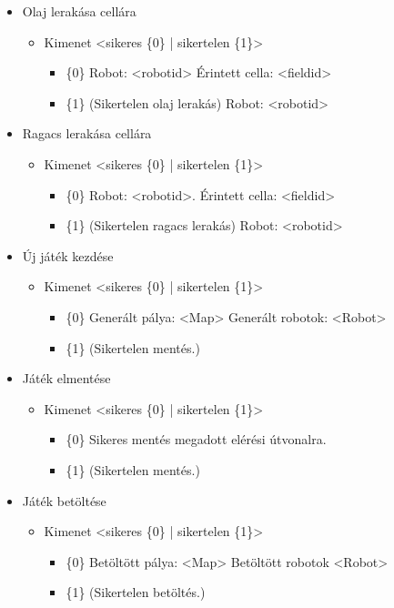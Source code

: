 \begin{itemize}
	\item Olaj lerakása cellára
	\begin{itemize}
		\item Kimenet <sikeres \{0\} | sikertelen \{1\}>
		\begin{itemize}
			\item \{0\} Robot: <robotid>  Érintett cella: <fieldid>
			\item \{1\} (Sikertelen olaj lerakás) Robot: <robotid>
		\end{itemize}
	\end{itemize}
	
	\item Ragacs lerakása cellára
	\begin{itemize}
		\item Kimenet <sikeres \{0\} | sikertelen \{1\}>
		\begin{itemize}
			\item \{0\} Robot: <robotid>. Érintett cella: <fieldid>
			\item \{1\} (Sikertelen ragacs lerakás) Robot: <robotid>
		\end{itemize}
	\end{itemize}	
	
	\item Új játék kezdése
	\begin{itemize}
		\item Kimenet <sikeres \{0\} | sikertelen \{1\}>
		\begin{itemize}
			\item \{0\} Generált pálya: <Map> Generált robotok: <Robot>
			\item \{1\} (Sikertelen mentés.)
		\end{itemize}
	\end{itemize}
	
	
	\item Játék elmentése
	\begin{itemize}
		\item Kimenet <sikeres \{0\} | sikertelen \{1\}>
		\begin{itemize}
			\item \{0\} Sikeres mentés megadott elérési útvonalra. 
			\item \{1\} (Sikertelen mentés.)
		\end{itemize}
	\end{itemize}

	\item Játék betöltése
	\begin{itemize}
		\item Kimenet <sikeres \{0\} | sikertelen \{1\}>
		\begin{itemize}
			\item \{0\} Betöltött pálya: <Map> Betöltött robotok <Robot> 
			\item \{1\} (Sikertelen betöltés.)
		\end{itemize}
	\end{itemize}
	

\end{itemize}
